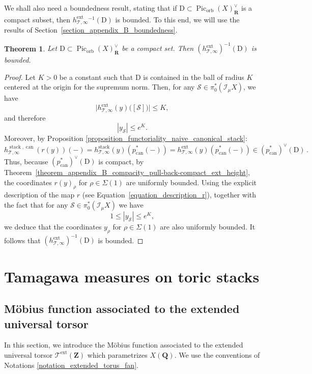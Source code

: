 \documentclass{proc-l}
\newcommand{\R}{\mathbf{R}}
\newcommand{\Z}{\mathbf{Z}}
\newcommand{\Q}{\mathbf{Q}}
\DeclareMathOperator{\Pic}{Pic}
\DeclareMathOperator{\can}{can}
\DeclareMathOperator{\stack}{stack}
\DeclareMathOperator{\orb}{orb}
\DeclareMathOperator{\ext}{ext}
\newcommand{\stackS}{\mathcal{S}}
\newcommand{\stackT}{\mathcal{T}}
\newcommand{\sheafI}{\mathcal{I}}
\newcommand{\twistsector}{\pi_0^*(\sheafI_{\mu} X)}
\newtheorem{theorem}{Theorem}[section]
\theoremstyle{definition}
\theoremstyle{remark}
\numberwithin{equation}{section}
\begin{document}
We shall also need a boundedness result, stating that if $\mathrm{D} \subset
\Pic_{\orb}(X)^{\vee}_{\R}$ is a compact subset, then
$h^{\ext}_{\stackT,\infty}{}^{-1}(\mathrm{D})$ is bounded. To this end, we will use the results of Section~\ref{section_appendix_B_boundedness}.

\begin{theorem}\label{theorem_compacity_pull-back-compact_ext_height}
    Let $\mathrm{D} \subset \Pic_{\orb}(X)^{\vee}_{\R}$ be a compact set. Then $(h^{\ext}_{\stackT,\infty})^{-1}(\mathrm{D})$ is bounded.
\end{theorem}

\begin{proof}
Let $K > 0$ be a constant such that $\mathrm{D}$ is contained in the ball of radius $K$
centered at the origin for the supremum norm. Then, for any
$\stackS \in \twistsector$, we have
\[
\bigl| h^{\ext}_{\stackT,\infty}(y)\bigl([\stackS]\bigr) \bigr| \leqslant K,
\]
and therefore
\[
|y_{\stackS}| \leqslant e^{K}.
\]
Moreover, by Proposition \ref{proposition_functoriality_naive_canonical_stack}:
$$h_{\stackT,\infty}^{\stack,\can}(r(y))(-) = h_{\stackT,\infty}^{\stack}(y)\left(p_{\can}^{*}(-)\right) = h_{\stackT,\infty}^{\ext}(y)\left(p_{\can}^{*}(-)\right) \in (p_{\can}^{*})^{\vee}(\mathrm{D})  \, .$$
Thus, because $(p_{\can}^{*})^{\vee}(\mathrm{D})$ is compact,  by Theorem~\ref{theorem_appendix_B_compacity_pull-back-compact_ext_height}, the coordinates
$r(y)_{\rho}$ for $\rho \in \Sigma(1)$ are uniformly bounded. Using the explicit
description of the map $r$ (see Equation~\eqref{equation_description_r}), together with
the fact that for any $\stackS \in \twistsector$ we have $$1 \leqslant |y_{\stackS}| \leqslant e^{K},$$we deduce that the coordinates $y_{\rho}$ for $\rho \in \Sigma(1)$ are also uniformly
bounded. It follows that $(h^{\ext}_{\stackT,\infty})^{-1}(\mathrm{D})$ is bounded.
\end{proof}


\section{Tamagawa measures on toric stacks}

\subsection{Möbius function associated to the extended universal torsor}

In this section, we introduce the Möbius function associated to the extended universal torsor $\stackT^{\ext}(\Z)$ which parametrizes $X(\Q)$. We use the conventions of Notations \ref{notation_extended_torus_fan}.
\end{document}
